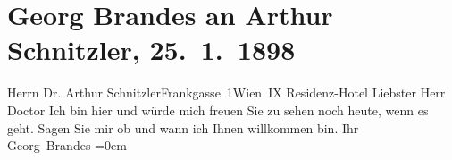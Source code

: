 

         \renewcommand{\erwaehnteOrte}{Orte: Frankgasse, IX., Alsergrund, Residenzhotel, Wien}
         \renewcommand{\erwaehnteWerke}{}
               \section[Georg Brandes an Arthur Schnitzler, 25. 1. 1898]{ Georg Brandes an Arthur Schnitzler, 25. 1. 1898}\nopagebreak{}\rehead{ }\begin{ledgroupsized}[t]{13cm}\normalsize\beginnumbering \toendnotes[C]{\smallbreak\pagebreak[2]} 
\pstart{}{\pb}Herrn Dr. Arthur Schnitzler\pend{}\pstart{}Frankgasse 1\pend{}\pstart{}Wien IX\pend{}{\bigskip}\pstart
           \noindent{}\centering{}{\pb}Residenz-Hotel\pend
           \pstart{}Liebster Herr Doctor\pend\pstart
           Ich bin hier und würde mich freuen Sie zu sehen noch heute, wenn es geht. Sagen Sie mir ob und wann ich Ihnen willkommen
                    bin.\pend
           \pstart
           Ihr{\\[\baselineskip]}\spacefill\mbox{Georg Brandes}\pend
           \leftskip=0em{}
         
         \endnumbering{}\end{ledgroupsized}  \newcommand{\dateiname}{L00766}\newcommand{\titel}{Georg Brandes an Arthur Schnitzler, 25. 1. 1898}\newcommand{\editorInnen}{Martin Anton Müller und Gerd-Hermann Susen}
      